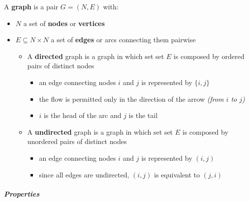 \documentclass[english]{article}
\begin{document}
A \textbf{graph} is a pair \(G = (N, E)\) with:

\begin{itemize}
  \item \(N\) a set of \textbf{nodes} or \textbf{vertices}
  \item \(E \subseteq N \times N\) a set of \textbf{edges} or arcs connecting them pairwise
        \begin{itemize}
          \item A \textbf{directed} graph is a graph in which set set \(E\) is composed by ordered pairs of distinct nodes
                \begin{itemize}[label=\(\rightarrow\)]
                  \item an edge connecting nodes \(i\) and \(j\) is represented by \(\{i, j\}\)
                  \item the flow is permitted only in the direction of the arrow \textit{(from \(i\) to \(j\))}
                  \item \(i\) is the head of the arc and \(j\) is the tail
                \end{itemize}
          \item A \textbf{undirected} graph is a graph in which set set \(E\) is composed by unordered pairs of distinct nodes
                \begin{itemize}[label=\(\rightarrow\)]
                  \item an edge connecting nodes \(i\) and \(j\) is represented by \((i, j)\)
                  \item since all edges are undirected, \((i, j)\) is equivalent to \((j, i)\)
                \end{itemize}
        \end{itemize}
\end{itemize}

\subparagraph*{Properties}
\end{document}
